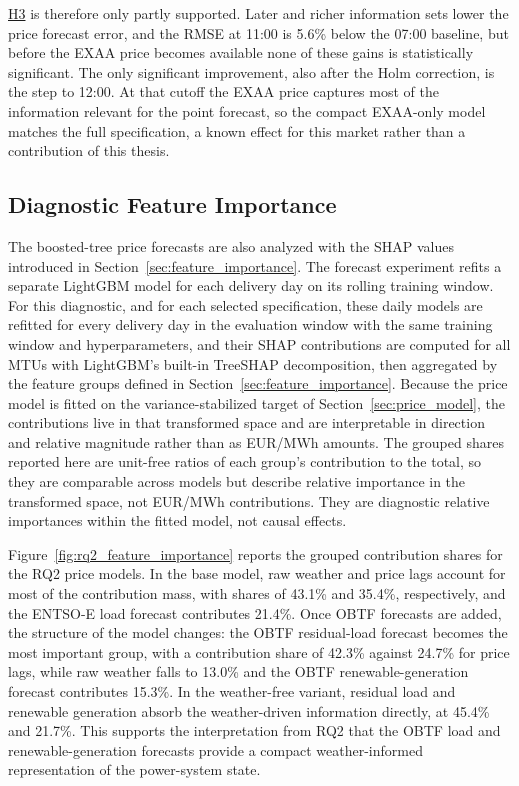 \FloatBarrier

\hyperlink{hyp:cutoff_sensitivity}{H3} is therefore only partly supported.
Later and richer information sets lower the price forecast error, and the RMSE
at 11:00 is 5.6\% below the 07:00 baseline, but before the EXAA price becomes
available none of these gains is statistically significant. The only significant
improvement, also after the Holm correction, is the step to 12:00. At that
cutoff the EXAA price captures most of the information relevant for the point
forecast, so the compact EXAA-only model matches the full specification, a known
effect for this market rather than a contribution of this thesis.

\FloatBarrier

\subsection{Diagnostic Feature Importance}
\label{sec:results_feature_importance}

The boosted-tree price forecasts are also analyzed with the SHAP values
introduced in Section~\ref{sec:feature_importance}. The forecast experiment
refits a separate LightGBM model for each delivery day on its rolling training
window. For this diagnostic, and for each selected specification, these daily
models are refitted for every delivery day in the evaluation window with the same
training window and hyperparameters, and their SHAP contributions are computed
for all MTUs with LightGBM's built-in TreeSHAP decomposition, then
aggregated by the feature groups defined in Section~\ref{sec:feature_importance}.
Because the price model is fitted on the variance-stabilized target of
Section~\ref{sec:price_model}, the contributions live in that transformed space
and are interpretable in direction and relative magnitude rather than as EUR/MWh
amounts. The grouped shares reported here are unit-free ratios of each group's
contribution to the total, so they are comparable across models but describe
relative importance in the transformed space, not EUR/MWh contributions. They
are diagnostic relative importances within the fitted model, not causal effects.

Figure~\ref{fig:rq2_feature_importance} reports the grouped contribution shares
for the RQ2 price models. In the base model, raw weather and price lags account
for most of the contribution mass, with shares of 43.1\% and 35.4\%, respectively,
and the \mbox{ENTSO-E} load forecast contributes 21.4\%. Once OBTF
forecasts are added, the structure of the model changes: the OBTF
residual-load forecast becomes the most important group, with a contribution
share of 42.3\% against 24.7\% for price lags, while raw weather falls to
13.0\% and the OBTF renewable-generation forecast contributes 15.3\%. In the
weather-free variant, residual load and renewable generation absorb the
weather-driven information directly, at 45.4\% and 21.7\%. This supports the interpretation from RQ2
that the OBTF load and renewable-generation forecasts provide a compact
weather-informed representation of the power-system state.

